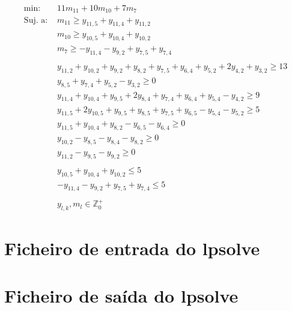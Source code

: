 \documentclass[12pt, a4paper, titlepage]{article}
\begin{document}
\begin{equation}
    \begin{split}
        \text{min: }    & 11 m_{11} + 10 m_{10} + 7 m_7 \\
        \text{Suj. a: } & m_{11} \geq   y_{11, 5} + y_{11, 4} + y_{11, 2} \\
                        & m_{10} \geq   y_{10, 5} + y_{10, 4} + y_{10, 2} \\
                        & m_7    \geq - y_{11, 4} - y_{9, 2}  + y_{7, 5} + y_{7, 4} \\ \\
                        & y_{11, 2} + y_{10, 2} + y_{9, 2} + y_{8, 2} + y_{7, 5} + y_{6, 4} +
                          y_{5, 2} + 2 y_{4, 2} + y_{3, 2} \geq 13 \\
                        & y_{8, 5} + y_{7, 4} + y_{5, 2} - y_{3, 2} \geq 0 \\
                        & y_{11, 4} + y_{10, 4} + y_{9, 5} + 2 y_{8, 4} + y_{7, 4} + y_{6, 4} +
                          y_{5, 4} - y_{4, 2} \geq 9 \\
                        & y_{11, 5} + 2 y_{10, 5} + y_{9, 5} + y_{8, 5} + y_{7, 5} + y_{6, 5} -
                          y_{5, 4} - y_{5, 2} \geq 5 \\
                        & y_{11, 5} + y_{10, 4} + y_{8, 2} - y_{6, 5} - y_{6, 4} \geq 0 \\
                        & y_{10, 2} - y_{8, 5} - y_{8, 4} - y_{8, 2} \geq 0 \\
                        & y_{11, 2} - y_{9, 5} - y_{9, 2} \geq 0 \\ \\
                        & y_{10, 5} + y_{10, 4} + y_{10, 2} \leq 5 \\
                        & - y_{11, 4} - y_{9, 2}  + y_{7, 5} + y_{7, 4} \leq 5 \\ \\
                        & y_{l, k}, m_l \in \mathbb{Z}_0^+
    \end{split} \nonumber
\end{equation}

\section{Ficheiro de entrada do lpsolve}


\section{Ficheiro de saída do lpsolve}

\end{document}
